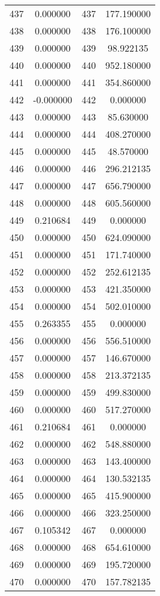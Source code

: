 \documentclass[12pt]{article}
\begin{document}
\begin{longtable}{@{}cccc@{}}
437 & 0.000000 & 437 & 177.190000 \\
438 & 0.000000 & 438 & 176.100000 \\
439 & 0.000000 & 439 & 98.922135 \\
440 & 0.000000 & 440 & 952.180000 \\
441 & 0.000000 & 441 & 354.860000 \\
442 & -0.000000 & 442 & 0.000000 \\
443 & 0.000000 & 443 & 85.630000 \\
444 & 0.000000 & 444 & 408.270000 \\
445 & 0.000000 & 445 & 48.570000 \\
446 & 0.000000 & 446 & 296.212135 \\
447 & 0.000000 & 447 & 656.790000 \\
448 & 0.000000 & 448 & 605.560000 \\
449 & 0.210684 & 449 & 0.000000 \\
450 & 0.000000 & 450 & 624.090000 \\
451 & 0.000000 & 451 & 171.740000 \\
452 & 0.000000 & 452 & 252.612135 \\
453 & 0.000000 & 453 & 421.350000 \\
454 & 0.000000 & 454 & 502.010000 \\
455 & 0.263355 & 455 & 0.000000 \\
456 & 0.000000 & 456 & 556.510000 \\
457 & 0.000000 & 457 & 146.670000 \\
458 & 0.000000 & 458 & 213.372135 \\
459 & 0.000000 & 459 & 499.830000 \\
460 & 0.000000 & 460 & 517.270000 \\
461 & 0.210684 & 461 & 0.000000 \\
462 & 0.000000 & 462 & 548.880000 \\
463 & 0.000000 & 463 & 143.400000 \\
464 & 0.000000 & 464 & 130.532135 \\
465 & 0.000000 & 465 & 415.900000 \\
466 & 0.000000 & 466 & 323.250000 \\
467 & 0.105342 & 467 & 0.000000 \\
468 & 0.000000 & 468 & 654.610000 \\
469 & 0.000000 & 469 & 195.720000 \\
470 & 0.000000 & 470 & 157.782135 \\

\end{longtable}
\end{document}
